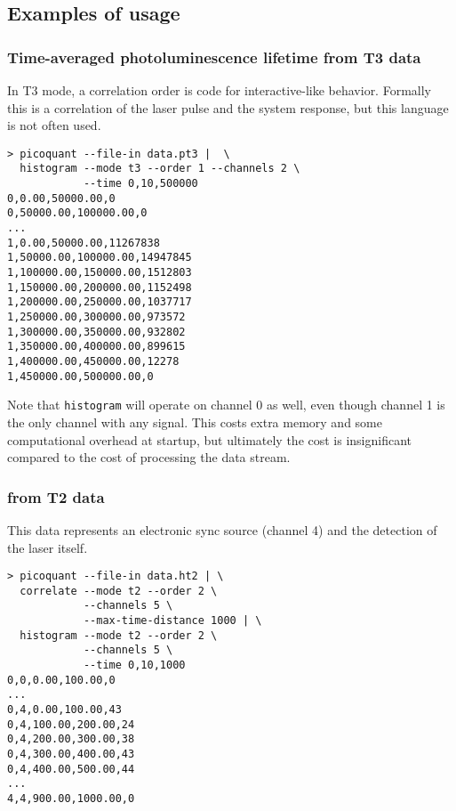 \subsection{Examples of usage}
\label{sec:histogram_examples}
\subsubsection{Time-averaged photoluminescence lifetime from T3 data}
In T3 mode, a correlation order  is code for interactive-like behavior. Formally this is a correlation of the laser pulse and the system response, but this language is not often used.
\begin{verbatim}
> picoquant --file-in data.pt3 |  \
  histogram --mode t3 --order 1 --channels 2 \
            --time 0,10,500000
0,0.00,50000.00,0
0,50000.00,100000.00,0
...
1,0.00,50000.00,11267838
1,50000.00,100000.00,14947845
1,100000.00,150000.00,1512803
1,150000.00,200000.00,1152498
1,200000.00,250000.00,1037717
1,250000.00,300000.00,973572
1,300000.00,350000.00,932802
1,350000.00,400000.00,899615
1,400000.00,450000.00,12278
1,450000.00,500000.00,0
\end{verbatim}
Note that \texttt{histogram} will operate on channel 0 as well, even though channel 1 is the only channel with any signal. This costs extra memory and some computational overhead at startup, but ultimately the cost is insignificant compared to the cost of processing the data stream.

\subsubsection{\gn{2} from T2 data}
This data represents an electronic sync source (channel 4) and the detection of the laser itself.
\begin{verbatim}
> picoquant --file-in data.ht2 | \
  correlate --mode t2 --order 2 \
            --channels 5 \
            --max-time-distance 1000 | \
  histogram --mode t2 --order 2 \
            --channels 5 \
            --time 0,10,1000
0,0,0.00,100.00,0
...
0,4,0.00,100.00,43
0,4,100.00,200.00,24
0,4,200.00,300.00,38
0,4,300.00,400.00,43
0,4,400.00,500.00,44
...
4,4,900.00,1000.00,0
\end{verbatim}

